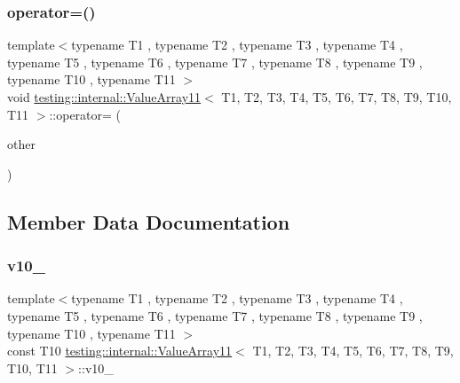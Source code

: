 \mbox{\label{classtesting_1_1internal_1_1_value_array11_afc232625c281dbc693117775f76e6fa4}} 
\subsubsection{\texorpdfstring{operator=()}{operator=()}}
{\footnotesize\ttfamily template$<$typename T1 , typename T2 , typename T3 , typename T4 , typename T5 , typename T6 , typename T7 , typename T8 , typename T9 , typename T10 , typename T11 $>$ \\
void \mbox{\hyperlink{classtesting_1_1internal_1_1_value_array11}{testing\+::internal\+::\+Value\+Array11}}$<$ T1, T2, T3, T4, T5, T6, T7, T8, T9, T10, T11 $>$\+::operator= (\begin{DoxyParamCaption}\item[{const \mbox{\hyperlink{classtesting_1_1internal_1_1_value_array11}{Value\+Array11}}$<$ T1, T2, T3, T4, T5, T6, T7, T8, T9, T10, T11 $>$ \&}]{other }\end{DoxyParamCaption})\hspace{0.3cm}{\ttfamily [private]}}



\subsection{Member Data Documentation}
\mbox{\label{classtesting_1_1internal_1_1_value_array11_a2dadac5c3ff045d8892189165c9d5b28}} 
\subsubsection{\texorpdfstring{v10\_}{v10\_}}
{\footnotesize\ttfamily template$<$typename T1 , typename T2 , typename T3 , typename T4 , typename T5 , typename T6 , typename T7 , typename T8 , typename T9 , typename T10 , typename T11 $>$ \\
const T10 \mbox{\hyperlink{classtesting_1_1internal_1_1_value_array11}{testing\+::internal\+::\+Value\+Array11}}$<$ T1, T2, T3, T4, T5, T6, T7, T8, T9, T10, T11 $>$\+::v10\+\_\+\hspace{0.3cm}{\ttfamily [private]}}

